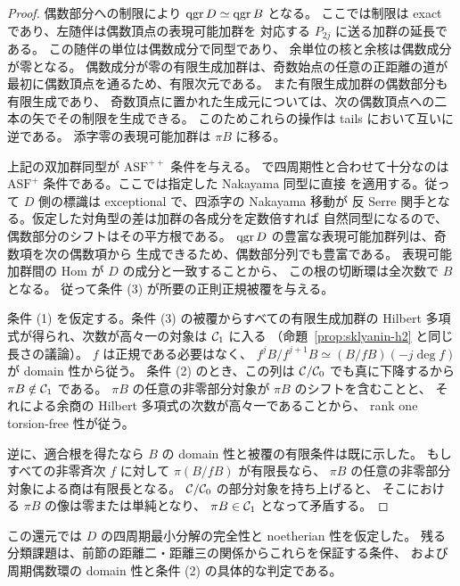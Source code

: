 \begin{proof}
偶数部分への制限により $\operatorname{qgr} D\simeq\operatorname{qgr} B$ となる。
ここでは制限は exact であり、左随伴は偶数頂点の表現可能加群を
対応する $P_{2j}$ に送る加群の延長である。
この随伴の単位は偶数成分で同型であり、
余単位の核と余核は偶数成分が零となる。
偶数成分が零の有限生成加群は、奇数始点の任意の正距離の道が
最初に偶数頂点を通るため、有限次元である。
また有限生成加群の偶数部分も有限生成であり、
奇数頂点に置かれた生成元については、次の偶数頂点への二本の矢でその制限を生成できる。
このためこれらの操作は tails において互いに逆である。
添字零の表現可能加群は $\pi B$ に移る。

上記の双加群同型が $\mathrm{ASF}^{++}$ 条件を与える。
\cite[Theorem 4.19]{MN2025} で四周期性と合わせて十分なのは
$\mathrm{ASF}^{+}$ 条件である。ここでは指定した Nakayama 同型に直接
\cite[Theorems 6.8 and 6.11, Proposition 4.11]{MN2025} を適用する。従って
$D$ 側の標識は exceptional で、四添字の Nakayama 移動が
反 Serre 関手となる。仮定した対角型の差は加群の各成分を定数倍すれば
自然同型になるので、偶数部分のシフトはその平方根である。
$\operatorname{qgr} D$ の豊富な表現可能加群列は、奇数項を次の偶数項から
生成できるため、偶数部分列でも豊富である。
表現可能加群間の Hom が $D$ の成分と一致することから、
この根の切断環は全次数で $B$ となる。
従って条件 (3) が所要の正則正規被覆を与える。

条件 (1) を仮定する。条件 (3) の被覆からすべての有限生成加群の
Hilbert 多項式が得られ、次数が高々一の対象は $\mathcal C_1$ に入る
（命題~\ref{prop:sklyanin-h2} と同じ長さの議論）。
$f$ は正規である必要はなく、
$f^jB/f^{j+1}B\simeq(B/fB)(-j\deg f)$ が domain 性から従う。
条件 (2) のとき、この列は $\mathcal C/\mathcal C_0$ でも真に下降するから
$\pi B\notin\mathcal C_1$ である。
$\pi B$ の任意の非零部分対象が $\pi B$ のシフトを含むことと、
それによる余商の Hilbert 多項式の次数が高々一であることから、
rank one torsion-free 性が従う。

逆に、適合根を得たなら $B$ の domain 性と被覆の有限条件は既に示した。
もしすべての非零斉次 $f$ に対して $\pi(B/fB)$ が有限長なら、
$\pi B$ の任意の非零部分対象による商は有限長となる。
$\mathcal C/\mathcal C_0$ の部分対象を持ち上げると、
そこにおける $\pi B$ の像は零または単純となり、
$\pi B\in\mathcal C_1$ となって矛盾する。
\end{proof}

この還元では $D$ の四周期最小分解の完全性と noetherian 性を仮定した。
残る分類課題は、前節の距離二・距離三の関係からこれらを保証する条件、
および周期偶数環の domain 性と条件 (2) の具体的な判定である。
